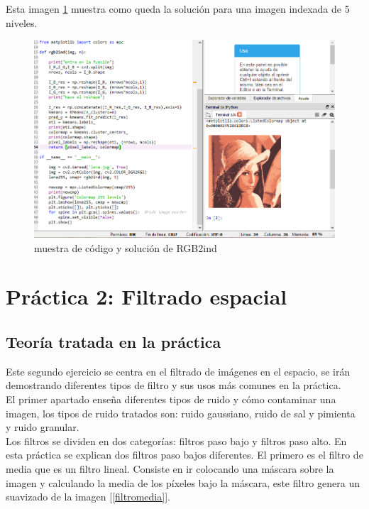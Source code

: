 \documentclass[a4paper,12pt]{report}
\begin{document}
Esta imagen \ref{rgb2ind} muestra como queda la solución para una imagen indexada de 5 niveles.
\begin{figure}[h]
\centering
\includegraphics[width=1\textwidth]{imagenes/rgb2ind}
\caption{muestra de código y solución de RGB2ind}
\label{rgb2ind}
\end{figure}


\section{ Práctica 2: Filtrado espacial}

\subsection{Teoría tratada en la práctica}

Este segundo ejercicio se centra en el filtrado de imágenes en el espacio, se irán demostrando diferentes tipos de filtro y sus usos más comunes en la práctica.\\

El primer apartado enseña diferentes tipos de ruido y cómo contaminar una imagen, los tipos de ruido tratados son: ruido gaussiano, ruido de sal y pimienta y ruido granular.\\

Los filtros se dividen en dos categorías: filtros paso bajo y filtros paso alto. En esta práctica se explican dos filtros paso bajos diferentes. El primero es el filtro de media que es un filtro lineal. Consiste en ir colocando una máscara sobre la imagen y calculando la media de los píxeles bajo la máscara, este filtro genera un suavizado de la imagen [\ref{filtromedia}].
\end{document}
